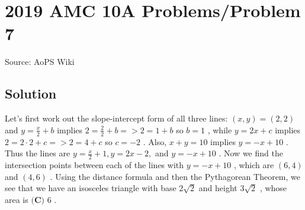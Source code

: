 \documentclass[12pt]{article}
\begin{document}
\section*{{2019 AMC 10A Problems/Problem 7}}
Source: AoPS Wiki

\subsection*{Solution}
Let's first work out the slope-intercept form of all three lines: $(x,y)=(2,2)$ and $y=\frac{x}{2} + b$ implies $2=\frac{2}{2} +b=> 2=1+b$ so $b=1$ , while $y=2x + c$ implies $2= 2 \cdot 2+c=> 2=4+c$ so $c=-2$ . Also, $x+y=10$ implies $y=-x+10$ . Thus the lines are $y=\frac{x}{2} +1, y=2x-2,$ and $y=-x+10$ .
Now we find the intersection points between each of the lines with $y=-x+10$ , which are $(6,4)$ and $(4,6)$ . Using the distance formula and then the Pythagorean Theorem, we see that we have an isosceles triangle with base $2\sqrt{2}$ and height $3\sqrt{2}$ , whose area is $\boxed{\textbf{(C) }6}$ .
\end{document}
